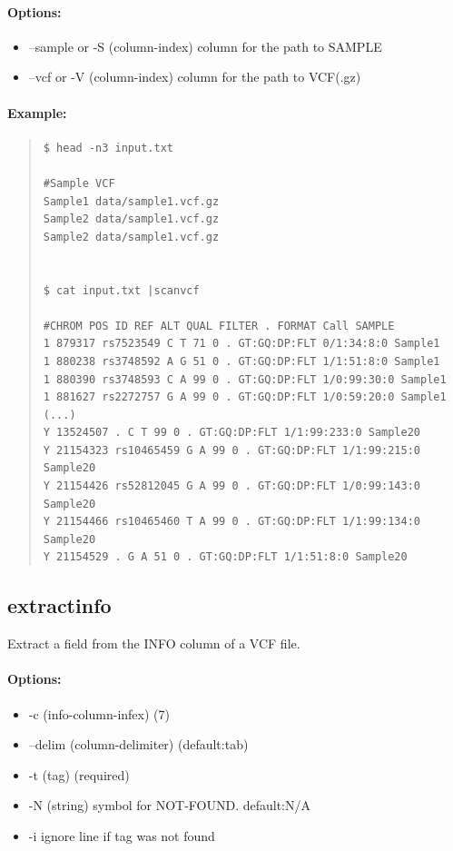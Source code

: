 \documentclass[12pt]{article}
\begin{document}
\paragraph{Options:}
\begin{itemize}
\item--sample or -S (column-index) column for the path to SAMPLE 
\item--vcf or -V (column-index) column for the path to VCF(.gz)
\end{itemize}

\paragraph{Example:}
\begin{quote}
\begin{verbatim}
$ head -n3 input.txt

#Sample	VCF
Sample1	data/sample1.vcf.gz
Sample2	data/sample1.vcf.gz
Sample2	data/sample1.vcf.gz


$ cat input.txt |scanvcf 

#CHROM POS ID REF ALT QUAL FILTER . FORMAT Call SAMPLE
1 879317 rs7523549 C T 71 0 . GT:GQ:DP:FLT 0/1:34:8:0 Sample1
1 880238 rs3748592 A G 51 0 . GT:GQ:DP:FLT 1/1:51:8:0 Sample1
1 880390 rs3748593 C A 99 0 . GT:GQ:DP:FLT 1/0:99:30:0 Sample1
1 881627 rs2272757 G A 99 0 . GT:GQ:DP:FLT 1/0:59:20:0 Sample1
(...)
Y 13524507 . C T 99 0 . GT:GQ:DP:FLT 1/1:99:233:0 Sample20
Y 21154323 rs10465459 G A 99 0 . GT:GQ:DP:FLT 1/1:99:215:0 Sample20
Y 21154426 rs52812045 G A 99 0 . GT:GQ:DP:FLT 1/0:99:143:0 Sample20
Y 21154466 rs10465460 T A 99 0 . GT:GQ:DP:FLT 1/1:99:134:0 Sample20
Y 21154529 . G A 51 0 . GT:GQ:DP:FLT 1/1:51:8:0 Sample20
\end{verbatim}
\end{quote}


\subsection{extractinfo}
Extract a field from the INFO column of a VCF file.
\paragraph{Options:}
\begin{itemize}
\item-c (info-column-infex) (7)
\item--delim (column-delimiter) (default:tab)
\item-t (tag) (required)
\item-N (string) symbol for NOT-FOUND. default:N/A
\item-i ignore line if tag was not found
\end{itemize}
\end{document}
